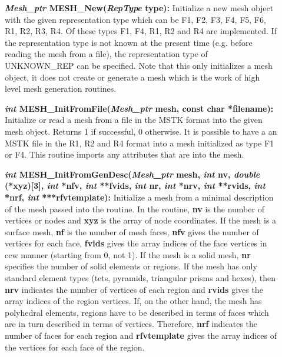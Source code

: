 \documentclass[12pt]{article}
\begin{document}
 
\begin{description}
\item[]{\bf {\em Mesh\_ptr} MESH\_New({\em RepType} type):}
  Initialize a new mesh object with the given representation type
  which can be F1, F2, F3, F4, F5, F6, R1, R2, R3, R4. Of these types
  F1, F4, R1, R2 and R4 are implemented. If the representation type is
  not known at the present time (e.g. before reading the mesh from a
  file), the representation type of UNKNOWN\_REP can be specified.
  Note that this only initializes a mesh object, it does not create or
  generate a mesh which is the work of high level mesh generation
  routines.

\item[]{\bf {\em int} MESH\_InitFromFile({\em Mesh\_ptr} mesh, const
    char *filename):} Initialize or read a mesh from a file in the
  MSTK format into the given mesh object. Returns 1 if successful, 0
  otherwise. It is possible to have a an MSTK file in the R1, R2 and
  R4 format into a mesh initialized as type F1 or F4. This routine
  imports any attributes that are into the mesh.

\item[]{\bf {\em int} MESH\_InitFromGenDesc({\em Mesh\_ptr} mesh, {\em
      int} nv, {\em double} (*xyz)[3], {\em int} *nfv, {\em int}
    **fvids, {\em int} nr, {\em int} *nrv, {\em int} **rvids, {\em
      int} *nrf, {\em int} ***rfvtemplate):} Initialize a mesh from a
  minimal description of the mesh passed into the routine. In the
  routine, {\bf nv} is the number of vertices or nodes and {\bf xyz}
  is the array of node coordinates. If the mesh is a surface mesh,
  {\bf nf} is the number of mesh faces, {\bf nfv} gives the number of
  vertices for each face, {\bf fvids} gives the array indices of the
  face vertices in ccw manner (starting from 0, not 1). If the mesh is
  a solid mesh, {\bf nr} specifies the number of solid elements or
  regions. If the mesh has only standard element types (tets,
  pyramids, triangular prisms and hexes), then {\bf nrv} indicates the
  number of vertices of each region and {\bf rvids} gives the array
  indices of the region vertices. If, on the other hand, the mesh has
  polyhedral elements, regions have to be described in terms of faces
  which are in turn described in terms of vertices. Therefore, {\bf
    nrf} indicates the number of faces for each region and {\bf
    rfvtemplate} gives the array indices of the vertices for each face
  of the region.


\end{description}
\end{document}

